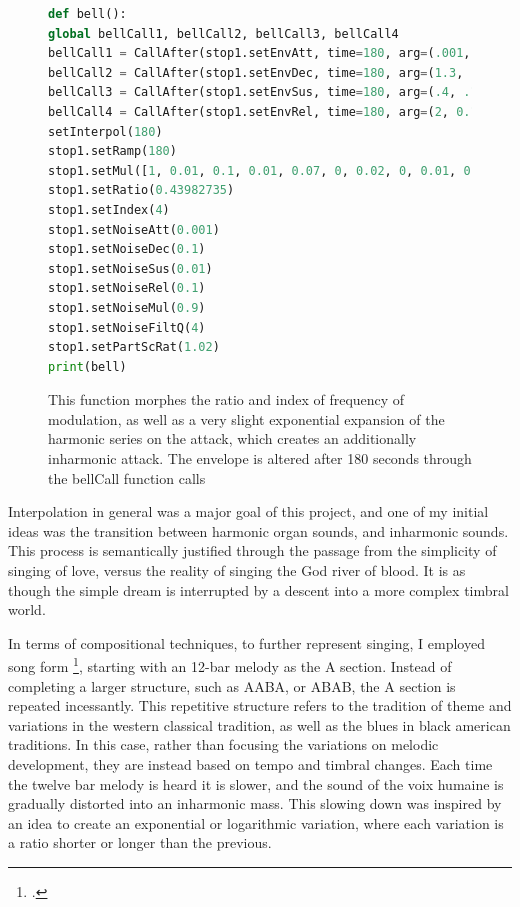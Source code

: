 \documentclass[12pt,twoside,maitrise]{dms_ks}
\theoremstyle{definition}
\begin{document}
{\begin{figure}[H]
\begin{lstlisting}[language=Python]
def bell():  
global bellCall1, bellCall2, bellCall3, bellCall4  
bellCall1 = CallAfter(stop1.setEnvAtt, time=180, arg=(.001, .001, .001, .001, 0.001, 0.001, 0.0001, 0.0006, 0.0007, 0.0005, 0.0006, 0.0003, 0.0005, 0.0003, 0.0006, 0.0005, 0.0004, 0.0002, 0.0001, 0.0001)).play()  
bellCall2 = CallAfter(stop1.setEnvDec, time=180, arg=(1.3, .05, .02, 0, 0, 0.04, .004, 0.04, .04, 0.04, .04, 0.04, .04, 0.04, .04, 0.04, .04, 0.04, .04, 0.04)).play()  
bellCall3 = CallAfter(stop1.setEnvSus, time=180, arg=(.4, .1, .02, .01, .01, 0.01, .01, 0.01, .01, 0.01, .01, 0.01, .01, 0.01, .01, 0.01, .01, 0.01, .002, 0.002)).play()  
bellCall4 = CallAfter(stop1.setEnvRel, time=180, arg=(2, 0.1, 0.1, .01, .03, 0.4, .04, 0.04, .04, 0.04, .04, 0.04, .04, 0.04, .04, 0.4, .04, 0.04, .04, 0.4)).play()  
setInterpol(180)  
stop1.setRamp(180)  
stop1.setMul([1, 0.01, 0.1, 0.01, 0.07, 0, 0.02, 0, 0.01, 0, 0.003, 0, 0.003, 0, 0.001, 0, 0.001, 0, 0.001, 0])  
stop1.setRatio(0.43982735)  
stop1.setIndex(4)  
stop1.setNoiseAtt(0.001)  
stop1.setNoiseDec(0.1)  
stop1.setNoiseSus(0.01)  
stop1.setNoiseRel(0.1)  
stop1.setNoiseMul(0.9)  
stop1.setNoiseFiltQ(4)  
stop1.setPartScRat(1.02)  
print(bell)  
\end{lstlisting}  
\caption{This function morphes the ratio and index of frequency of modulation, as well as a very slight exponential expansion of the harmonic series on the attack, which creates an additionally inharmonic attack. The envelope is altered after 180 seconds through the bellCall function calls}  
\end{figure}

Interpolation in general was a major goal of this project, and one of my initial ideas was the transition between harmonic organ sounds, and inharmonic sounds.  
This process is semantically justified through the passage from the simplicity of singing of love, versus the reality of singing the God river of blood.  
It is as though the simple dream is interrupted by a descent into a more complex timbral world.

In terms of compositional techniques, to further represent singing, I employed song form \footcite{owens_forms_2003}, starting with an 12-bar melody as the A section.
Instead of completing a larger structure, such as AABA, or ABAB, the A section is repeated incessantly.
This repetitive structure refers to the tradition of theme and variations in the western classical tradition, as well as the blues in black american traditions.  
In this case, rather than focusing the variations on melodic development, they are instead based on tempo and timbral changes. 
Each time the twelve bar melody is heard it is slower, and the sound of the voix humaine is gradually distorted into an inharmonic mass.
This slowing down was inspired by an idea to create an exponential or logarithmic variation, where each variation is a ratio shorter or longer than the previous.

}
\end{document}
